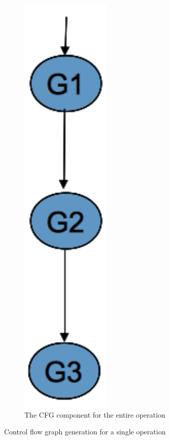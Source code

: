 \begin{figure}
\begin{subfigure}[b]{0.2\textwidth}
    \includegraphics[width=.4\linewidth]{figs/cfg-example3}
    \caption{The CFG component for the entire operation}
    \label{fig:cfgc}
  \end{subfigure}%
  \caption{Control flow graph generation for a single operation}
  \label{fig:cfg}
\end{figure}

